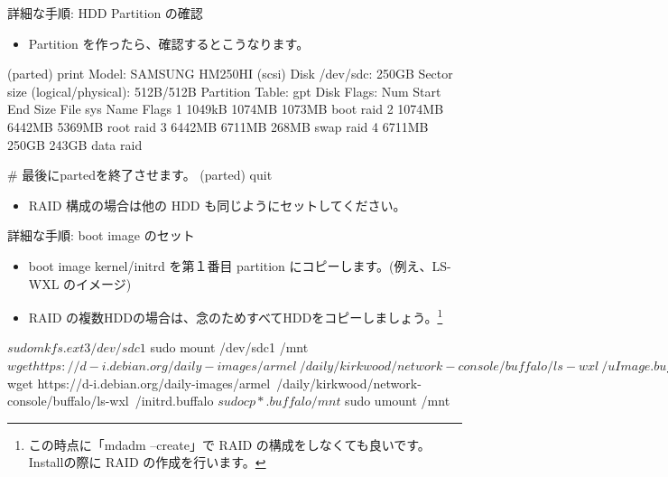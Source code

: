 \begin{frame}[containsverbatim]{詳細な手順: HDD Partition の確認}
\begin{itemize}
\item Partition を作ったら、確認するとこうなります。
\end{itemize}
\begin{commandline}
(parted) print
Model: SAMSUNG HM250HI (scsi)
Disk /dev/sdc: 250GB
Sector size (logical/physical): 512B/512B
Partition Table: gpt
Disk Flags:
Num Start   End     Size    File sys  Name  Flags
 1  1049kB  1074MB  1073MB            boot  raid
 2  1074MB  6442MB  5369MB            root  raid
 3  6442MB  6711MB  268MB             swap  raid
 4  6711MB  250GB   243GB             data  raid

# 最後にpartedを終了させます。
(parted) quit
\end{commandline}
\begin{itemize}
\item RAID 構成の場合は他の HDD も同じようにセットしてください。
\end{itemize}
\end{frame}

\begin{frame}[containsverbatim]{詳細な手順: boot image のセット}
\begin{itemize}
\item boot image kernel/initrd を第１番目 partition にコピーします。(例え、LS-WXL のイメージ)
\item RAID の複数HDDの場合は、念のためすべてHDDをコピーしましょう。\footnote{この時点に「mdadm --create」で RAID の構成をしなくても良いです。Installの際に RAID の作成を行います。}
\end{itemize}
\begin{commandline}
$ sudo mkfs.ext3 /dev/sdc1
$ sudo mount /dev/sdc1 /mnt
$ wget https://d-i.debian.org/daily-images/armel\
  /daily/kirkwood/network-console/buffalo/ls-wxl\
  /uImage.buffalo
$ wget https://d-i.debian.org/daily-images/armel\
  /daily/kirkwood/network-console/buffalo/ls-wxl\
  /initrd.buffalo
$ sudo cp *.buffalo /mnt
$ sudo umount /mnt
\end{commandline}
\end{frame}

